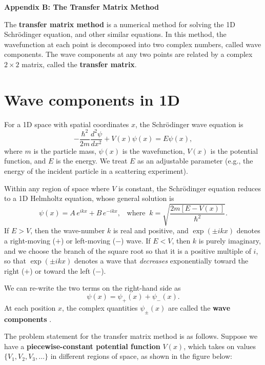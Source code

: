 \documentclass[prx,12pt]{revtex4-2}
\begin{document}
\begin{center}
{\large \textbf{Appendix B: The Transfer Matrix Method}}
\end{center}

\noindent
The \textbf{transfer matrix method} is a numerical method for solving
the 1D Schr\"odinger equation, and other similar equations.  In this
method, the wavefunction at each point is decomposed into two complex
numbers, called wave components.  The wave components at any two
points are related by a complex $2\times2$ matrix, called the
\textbf{transfer matrix}.

\section{Wave components in 1D}

For a 1D space with spatial coordinates $x$, the Schr\"odinger wave
equation is
\begin{equation}
  -\frac{\hbar^2}{2m}\frac{d^2\psi}{dx^2} + V(x) \psi(x) = E\psi(x),
\end{equation}
where $m$ is the particle mass, $\psi(x)$ is the wavefunction, $V(x)$
is the potential function, and $E$ is the energy.  We treat $E$ as an
adjustable parameter (e.g., the energy of the incident particle in a
scattering experiment).

Within any region of space where $V$ is constant, the Schr\"odinger
equation reduces to a 1D Helmholtz equation, whose general solution is
\begin{equation}
  \psi(x) = A\, e^{ik x} + B\, e^{-ik x}, \;\;\; \mathrm{where}\;\; k = \sqrt{\frac{2m[E-V(x)]}{\hbar^2}}.
\end{equation}
If $E > V$, then the wave-number $k$ is real and positive, and
$\exp(\pm ikx)$ denotes a right-moving ($+$) or left-moving ($-$)
wave.  If $E < V$, then $k$ is purely imaginary, and we choose the
branch of the square root so that it is a positive multiple of $i$, so
that $\exp(\pm ikx)$ denotes a wave that \textit{decreases}
exponentially toward the right ($+$) or toward the left ($-$).

We can re-write the two terms on the right-hand side as
\begin{equation}
  \psi(x) = \psi_+(x) + \psi_-(x).
\end{equation}
At each position $x$, the complex quantities $\psi_\pm(x)$ are called
the \textbf{wave components} .

The problem statement for the transfer matrix method is as follows.
Suppose we have a \textbf{piecewise-constant potential function}
$V(x)$, which takes on values $\{V_1, V_2, V_3, \dots\}$ in different
regions of space, as shown in the figure below:
\end{document}
